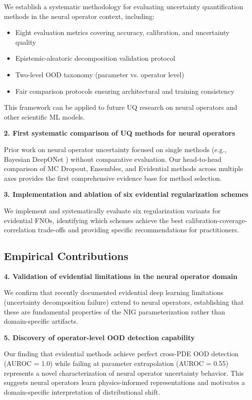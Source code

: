 We establish a systematic methodology for evaluating uncertainty quantification methods in the neural operator context, including:
\begin{itemize}
\item Eight evaluation metrics covering accuracy, calibration, and uncertainty quality
\item Epistemic-aleatoric decomposition validation protocol
\item Two-level OOD taxonomy (parameter vs. operator level)
\item Fair comparison protocols ensuring architectural and training consistency
\end{itemize}

This framework can be applied to future UQ research on neural operators and other scientific ML models.

\textbf{2. First systematic comparison of UQ methods for neural operators}

Prior work on neural operator uncertainty focused on single methods (e.g., Bayesian DeepONet \cite{psaros2023uncertainty}) without comparative evaluation. Our head-to-head comparison of MC Dropout, Ensembles, and Evidential methods across multiple axes provides the first comprehensive evidence base for method selection.

\textbf{3. Implementation and ablation of six evidential regularization schemes}

We implement and systematically evaluate six regularization variants for evidential FNOs, identifying which schemes achieve the best calibration-coverage-correlation trade-offs and providing specific recommendations for practitioners.

\subsection{Empirical Contributions}

\textbf{4. Validation of evidential limitations in the neural operator domain}

We confirm that recently documented evidential deep learning limitations (uncertainty decomposition failure) extend to neural operators, establishing that these are fundamental properties of the NIG parameterization rather than domain-specific artifacts.

\textbf{5. Discovery of operator-level OOD detection capability}

Our finding that evidential methods achieve perfect cross-PDE OOD detection (AUROC = 1.0) while failing at parameter extrapolation (AUROC = 0.55) represents a novel characterization of neural operator uncertainty behavior. This suggests neural operators learn physics-informed representations and motivates a domain-specific interpretation of distributional shift.

